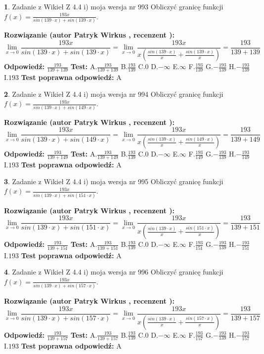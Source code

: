\documentclass[12pt, a4paper]{article}
\theoremstyle{definition} %
\newtheorem{zad}{}
\newcommand{\zadStart}[1]{\begin{zad}#1\newline}
\newcommand{\zadStop}{\end{zad}}
\newcommand{\rozwStart}[2]{\noindent \textbf{Rozwiązanie (autor #1 , recenzent #2): }\newline}
\newcommand{\rozwStop}{\newline}
\newcommand{\odpStart}{\noindent \textbf{Odpowiedź:}\newline}
\newcommand{\odpStop}{\newline}
\newcommand{\testStart}{\noindent \textbf{Test:}\newline}
\newcommand{\testStop}{\newline}
\newcommand{\kluczStart}{\noindent \textbf{Test poprawna odpowiedź:}\newline}
\newcommand{\kluczStop}{\newline}
\begin{document}
\zadStart{Zadanie z Wikieł Z 4.4 i) moja wersja nr 993}
Obliczyć granicę funkcji $f(x)=\frac{193x}{sin(139\cdot x) +sin(139\cdot x)}$.
\zadStop
\rozwStart{Patryk Wirkus}{}
$$\lim\limits_{x\to 0}\frac{193x}{sin(139\cdot x) +sin(139\cdot x)}=\lim\limits_{x\to 0}\frac{193x}{x(\frac{sin(139\cdot x)}{x}+\frac{sin(139\cdot x)}{x})}=\frac{193}{139+139}$$
\rozwStop
\odpStart
$\frac{193}{139+139}$
\odpStop
\testStart
A.$\frac{193}{139+139}$
B.$\frac{193}{139}$
C.$0$
D.$-\infty$
E.$\infty$
F.$\frac{193}{139}$
G.$-\frac{193}{139}$
H.$-\frac{193}{139}$
I.$193$
\testStop
\kluczStart
A
\kluczStop



\zadStart{Zadanie z Wikieł Z 4.4 i) moja wersja nr 994}
Obliczyć granicę funkcji $f(x)=\frac{193x}{sin(139\cdot x) +sin(149\cdot x)}$.
\zadStop
\rozwStart{Patryk Wirkus}{}
$$\lim\limits_{x\to 0}\frac{193x}{sin(139\cdot x) +sin(149\cdot x)}=\lim\limits_{x\to 0}\frac{193x}{x(\frac{sin(139\cdot x)}{x}+\frac{sin(149\cdot x)}{x})}=\frac{193}{139+149}$$
\rozwStop
\odpStart
$\frac{193}{139+149}$
\odpStop
\testStart
A.$\frac{193}{139+149}$
B.$\frac{193}{139}$
C.$0$
D.$-\infty$
E.$\infty$
F.$\frac{193}{149}$
G.$-\frac{193}{139}$
H.$-\frac{193}{149}$
I.$193$
\testStop
\kluczStart
A
\kluczStop



\zadStart{Zadanie z Wikieł Z 4.4 i) moja wersja nr 995}
Obliczyć granicę funkcji $f(x)=\frac{193x}{sin(139\cdot x) +sin(151\cdot x)}$.
\zadStop
\rozwStart{Patryk Wirkus}{}
$$\lim\limits_{x\to 0}\frac{193x}{sin(139\cdot x) +sin(151\cdot x)}=\lim\limits_{x\to 0}\frac{193x}{x(\frac{sin(139\cdot x)}{x}+\frac{sin(151\cdot x)}{x})}=\frac{193}{139+151}$$
\rozwStop
\odpStart
$\frac{193}{139+151}$
\odpStop
\testStart
A.$\frac{193}{139+151}$
B.$\frac{193}{139}$
C.$0$
D.$-\infty$
E.$\infty$
F.$\frac{193}{151}$
G.$-\frac{193}{139}$
H.$-\frac{193}{151}$
I.$193$
\testStop
\kluczStart
A
\kluczStop



\zadStart{Zadanie z Wikieł Z 4.4 i) moja wersja nr 996}
Obliczyć granicę funkcji $f(x)=\frac{193x}{sin(139\cdot x) +sin(157\cdot x)}$.
\zadStop
\rozwStart{Patryk Wirkus}{}
$$\lim\limits_{x\to 0}\frac{193x}{sin(139\cdot x) +sin(157\cdot x)}=\lim\limits_{x\to 0}\frac{193x}{x(\frac{sin(139\cdot x)}{x}+\frac{sin(157\cdot x)}{x})}=\frac{193}{139+157}$$
\rozwStop
\odpStart
$\frac{193}{139+157}$
\odpStop
\testStart
A.$\frac{193}{139+157}$
B.$\frac{193}{139}$
C.$0$
D.$-\infty$
E.$\infty$
F.$\frac{193}{157}$
G.$-\frac{193}{139}$
H.$-\frac{193}{157}$
I.$193$
\testStop
\kluczStart
A
\kluczStop
\end{document}
